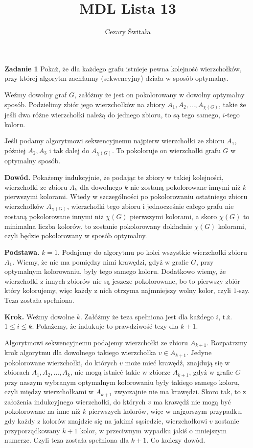 \documentclass[12pt,a4paper]{article}
\title{MDL Lista 13}
\author{Cezary Świtała}
\begin{document}
\maketitle

\noindent
\textbf{Zadanie 1} Pokaż, że dla każdego grafu istnieje pewna kolejność wierzchołków, przy której algorytm zachłanny (sekwencyjny) działa w sposób optymalny.
\vskip 0.2cm

Weźmy dowolny graf \(G\), załóżmy że jest on pokolorowany w dowolny optymalny sposób. Podzielimy zbiór jego wierzchołków na zbiory \(A_1, A_2,...,A_{\chi(G)}\), takie że jeśli dwa różne wierzchołki należą do jednego zbioru, to są tego samego, \(i\)-tego koloru. 

Jeśli podamy algorytmowi sekwencyjnemu najpierw wierzchołki ze zbioru \(A_1\), później \(A_2, A_3\) i tak dalej do \(A_{\chi(G)}\). To pokoloruje on wierzchołki grafu \(G\) w optymalny sposób.

\textbf{Dowód.} Pokażemy indukcyjnie, że podając te zbiory w takiej kolejności, wierzchołki ze zbioru \(A_k\) dla dowolnego \(k\) nie zostaną pokolorowane innymi niż \(k\) pierwszymi kolorami. Wtedy w szczególności po pokolorowaniu ostatniego zbioru wierzchołków \(A_{\chi(G)}\), wierzchołki tego zbioru i jednocześnie całego grafu nie zostaną pokolorowane innymi niż \(\chi(G)\) pierwszymi kolorami, a skoro \(\chi(G)\) to minimalna liczba kolorów, to zostanie pokolorowany dokładnie \( \chi(G) \) kolorami, czyli będzie pokolorowany w sposób optymalny.

\textbf{Podstawa.} \(k=1\). Podajemy do algorytmu po kolei wszystkie wierzchołki zbioru \(A_1\). Wiemy, że nie ma pomiędzy nimi krawędzi, gdyż w grafie \(G\), przy optymalnym kolorowaniu, były tego samego koloru. Dodatkowo wiemy, że wierzchołki z innych zbiorów nie są jeszcze pokolorowane, bo to pierwszy zbiór który kolorujemy, więc każdy z nich otrzyma najmniejszy wolny kolor, czyli \(1\)-szy. Teza została spełniona.

\textbf{Krok.} Weźmy dowolne \(k\). Załóżmy że teza spełniona jest dla każdego \(i\), t.ż. \(1 \leq i \leq k\). Pokażemy, że indukuje to prawdziwość tezy dla \(k+1\).

Algorytmowi sekwencyjnemu podajemy wierzchołki ze zbioru \(A_{k+1}\). Rozpatrzmy krok algorytmu dla dowolnego takiego wierzchołka \(v \in A_{k+1}\). Jedyne pokolorowane wierzchołki, do których \(v\) może mieć krawędź, znajdują się w zbiorach \(A_1, A_2, ... , A_k\), nie mogą istnieć takie w zbiorze \(A_{k+1}\), gdyż w grafie \(G\) przy naszym wybranym optymalnym kolorowaniu były takiego samego koloru, czyli między wierzchołkami w \(A_{k+1}\) zwyczajnie nie ma krawędzi. Skoro tak, to z założenia indukcyjnego wierzchołki, do których \(v\) ma krawędź nie mogą być pokolorowane na inne niż \(k\) pierwszych kolorów, więc w najgorszym przypadku, gdy każdy z kolorów znajdzie się na jakimś sąsiedzie, wierzchołkowi \(v\) zostanie przyporządkowany \(k+1\) kolor, w przeciwnym wypadku jakiś o mniejszym numerze. Czyli teza została spełniona dla \(k+1\). Co kończy dowód.
\end{document}
